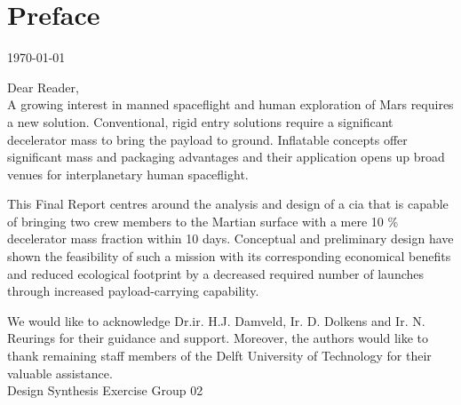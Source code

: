 \section*{Preface}\label{cha:preface}

\begin{flushright}
	\today
\end{flushright}

Dear Reader,	
\\ [1cm]
A growing interest in manned spaceflight and human exploration of Mars requires a new solution. Conventional, rigid entry solutions require a significant decelerator mass to bring the payload to ground. Inflatable concepts offer significant mass and packaging advantages and their application opens up broad venues for interplanetary human spaceflight. 

This Final Report centres around the analysis and design of a \acrlong{cia} that is capable of bringing two crew members to the Martian surface with a mere 10 \% decelerator mass fraction within 10 days. Conceptual and preliminary design have shown the feasibility of such a mission with its corresponding economical benefits and reduced ecological footprint by a decreased required number of launches through increased payload-carrying capability.

We would like to acknowledge Dr.ir. H.J. Damveld, Ir. D. Dolkens and Ir. N. Reurings for their guidance and support. Moreover, the authors would like to thank remaining staff members of the Delft University of Technology for their valuable assistance.
\\ [1.5cm]
Design Synthesis Exercise Group 02
